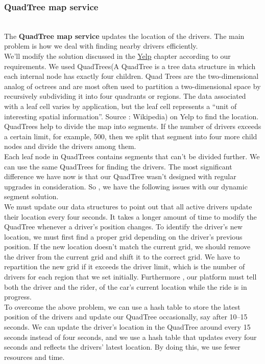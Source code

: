 \subsubsection{QuadTree map service}\label{T7Mry4tG8vRwlfA_c4EM1}
\\
The \textbf{QuadTree map service} updates the location of the drivers. The main problem is how we deal with finding nearby drivers efficiently.
\\
We'll modify the solution discussed in the \href{https://www.educative.io/courses/grokking-the-system-design-interview/system-design-yelp}{Yelp} chapter according to our requirements. We used QuadTrees(A QuadTree is a tree data structure in which each internal node has exactly four children. Quad Trees are the two-dimensional analog of octrees and are most often used to partition a two-dimensional space by recursively subdividing it into four quadrants or regions. The data associated with a leaf cell varies by application, but the leaf cell represents a ``unit of interesting spatial information''. Source
: Wikipedia) on Yelp to find the location. QuadTrees help to divide the map into segments. If the number of drivers exceeds a certain limit, for example, 500, then we split that segment into four more child nodes and divide the drivers among them.
\\
Each leaf node in QuadTrees contains segments that can't be divided further. We can use the same QuadTrees for finding the drivers. The most significant difference we have now is that our QuadTree wasn't designed with regular upgrades in consideration. So , we have the following issues with our dynamic segment solution.
\\
We must update our data structures to point out that all active drivers update their location every four seconds. It takes a longer amount of time to modify the QuadTree whenever a driver's position changes. To identify the driver's new location, we must first find a proper grid depending on the driver's previous position. If the new location doesn't match the current grid, we should remove the driver from the current grid and shift it to the correct grid. We have to repartition the new grid if it exceeds the driver limit, which is the number of drivers for each region that we set initially. Furthermore , our platform must tell both the driver and the rider, of the car's current location while the ride is in progress.
\\
To overcome the above problem, we can use a hash table to store the latest position of the drivers and update our QuadTree occasionally, say after 10--15 seconds. We can update the driver's location in the QuadTree around every 15 seconds instead of four seconds, and we use a hash table that updates every four seconds and reflects the drivers' latest location. By doing this, we use fewer resources and time.

